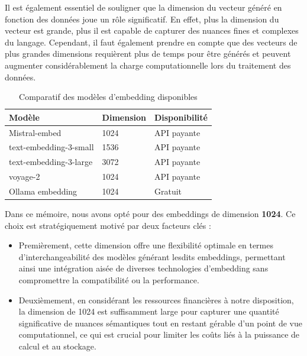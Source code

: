 Il est également essentiel de souligner que la dimension du vecteur généré en fonction des données joue un rôle significatif. En effet, plus la dimension du vecteur est grande, plus il est capable de capturer des nuances fines et complexes du langage. Cependant, il faut également prendre en compte que des vecteurs de plus grandes dimensions requièrent plus de temps pour être générés et peuvent augmenter considérablement la charge computationnelle lors du traitement des données.

\newpage

\begin{table}[h]
\centering
\begin{tabular}{|p{7cm}|p{3cm}|p{3cm}|}
\hline
\textbf{Modèle}            & \textbf{Dimension} & \textbf{Disponibilité} \\ \hline
Mistral-embed              & 1024               & API payante            \\ \hline
text-embedding-3-small     & 1536               & API payante            \\ \hline
text-embedding-3-large     & 3072               & API payante            \\ \hline
voyage-2                   & 1024               & API payante            \\ \hline
Ollama embedding           & 1024               & Gratuit     \\ \hline
\end{tabular}

\caption{Comparatif des modèles d'embedding disponibles}
\label{table:embedding_models}
\end{table}


Dans ce mémoire, nous avons opté pour des embeddings de dimension \textbf{1024}. Ce choix est stratégiquement motivé par deux facteurs clés : 
\begin{itemize}
    \item Premièrement, cette dimension offre une flexibilité optimale en termes d'interchangeabilité des modèles générant lesdits embeddings, permettant ainsi une intégration aisée de diverses technologies d'embedding sans compromettre la compatibilité ou la performance.

    \item Deuxièmement, en considérant les ressources financières à notre disposition, la dimension de 1024 est suffisamment large pour capturer une quantité significative de nuances sémantiques tout en restant gérable d'un point de vue computationnel, ce qui est crucial pour limiter les coûts liés à la puissance de calcul et au stockage.
\end{itemize}

